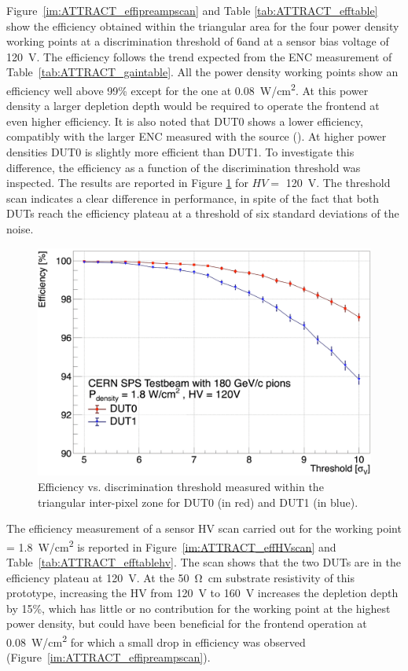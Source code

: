 		Figure~\ref{im:ATTRACT_effipreampscan} and Table \ref{tab:ATTRACT_efftable} show the efficiency obtained within the triangular area for the four power density working points at a discrimination threshold of 6\noise and at a sensor bias voltage of \SI{120}{\volt}. The efficiency follows the trend expected from the ENC measurement of Table~\ref{tab:ATTRACT_gaintable}. All the power density working points show an efficiency well above 99\% except for the one at \SI{0.08}{\watt/\centi\meter^2}. At this power density a larger depletion depth would be required to operate the frontend at even higher efficiency. It is also noted that DUT0 shows a lower efficiency, compatibly with the larger ENC measured with the \Cd source (). At higher power densities DUT0 is slightly more efficient than DUT1. To investigate this difference, the efficiency as a function of the discrimination threshold was inspected. The results are reported in Figure \ref{im:ATTRACT_effthrscan} for $ HV =$ \SI{120}{\volt}. The threshold scan indicates a clear difference in performance, in spite of the fact that both DUTs reach the efficiency plateau at a threshold of six standard deviations of the noise. 

		\begin{figure}[h]
			\centering 
			\includegraphics[width=0.65\linewidth]{files/ATTRACT_paper/EfficiencyScan_120V_150uA}
			\caption{Efficiency vs. discrimination threshold measured within the triangular inter-pixel zone for  DUT0 (in red) and DUT1 (in blue).}
			\label{im:ATTRACT_effthrscan} 
		\end{figure}

		The efficiency measurement of a sensor HV scan carried out for the working point  \power = \SI{1.8}{\watt/\centi\meter^2} is reported in Figure~\ref{im:ATTRACT_effHVscan} and Table~\ref{tab:ATTRACT_efftablehv}. 
		The scan shows that the two DUTs are in the efficiency plateau at \SI{120}{\volt}. At the \SI{50}{\ohm\cm} substrate resistivity of this prototype, increasing the HV from \SI{120}{\volt} to \SI{160}{\volt} increases the depletion depth by 15\%, which has little or no contribution for the working point at the highest power density, but could have been beneficial for the frontend operation at \SI{0.08}{\watt/\centi\meter^2} for which a small drop in efficiency was observed (Figure~\ref{im:ATTRACT_effipreampscan}).
		
